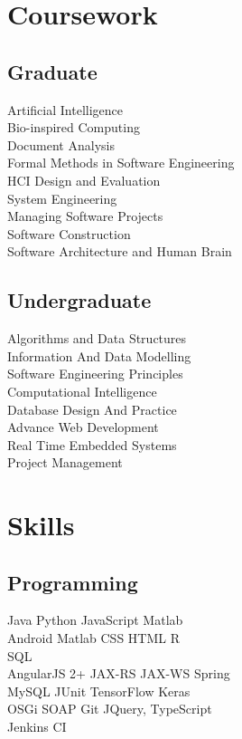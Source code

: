 \documentclass[]{pubudu-resume-openfont}
\begin{document}
\begin{minipage}[t]{0.33\textwidth}

\section{Coursework}
\subsection{Graduate}
Artificial Intelligence \\
Bio-inspired Computing  \\
Document Analysis  \\
Formal Methods in Software Engineering  \\
HCI Design and Evaluation \\
System Engineering \\
Managing Software Projects \\
Software Construction \\
Software Architecture and Human Brain\\
\sectionsep

\subsection{Undergraduate}
Algorithms and Data Structures\\
Information And Data Modelling\\
Software Engineering Principles\\
Computational Intelligence\\
Database Design And Practice\\
Advance Web Development \\
Real Time Embedded Systems \\
Project Management\\
\sectionsep


\section{Skills}
\subsection{Programming}
Java \textbullet{}   Python \textbullet{} JavaScript \textbullet{} Matlab \\
Android \textbullet{} Matlab \textbullet{} CSS \textbullet{} HTML \textbullet{} R \\
SQL \textbullet{} \Csh{} \\
AngularJS 2+ \textbullet{} JAX-RS \textbullet{} JAX-WS \textbullet{} Spring \\
MySQL \textbullet{} JUnit \textbullet{} TensorFlow \textbullet{} Keras \\ 
OSGi \textbullet{} SOAP \textbullet{} Git \textbullet{} JQuery, \textbullet{} TypeScript \\
Jenkins CI 
\sectionsep


\end{minipage}
\end{document}
